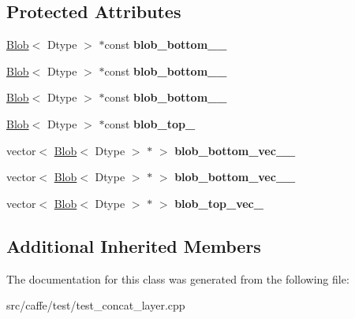 \subsection*{Protected Attributes}
\begin{DoxyCompactItemize}
\item 
\mbox{\label{classcaffe_1_1_concat_layer_test_aa9a684205bc4a4d5c55ef4ef3d6e5527}} 
\mbox{\hyperlink{classcaffe_1_1_blob}{Blob}}$<$ Dtype $>$ $\ast$const {\bfseries blob\+\_\+bottom\+\_\+\_\+}
\item 
\mbox{\label{classcaffe_1_1_concat_layer_test_ad98178e3e167b8954ba9d206c690006c}} 
\mbox{\hyperlink{classcaffe_1_1_blob}{Blob}}$<$ Dtype $>$ $\ast$const {\bfseries blob\+\_\+bottom\+\_\+\_\+}
\item 
\mbox{\label{classcaffe_1_1_concat_layer_test_a7b25b1484e2086b7213f8bdb08805f25}} 
\mbox{\hyperlink{classcaffe_1_1_blob}{Blob}}$<$ Dtype $>$ $\ast$const {\bfseries blob\+\_\+bottom\+\_\+\_\+}
\item 
\mbox{\label{classcaffe_1_1_concat_layer_test_aadb76716632a13c78dec8366b6d49234}} 
\mbox{\hyperlink{classcaffe_1_1_blob}{Blob}}$<$ Dtype $>$ $\ast$const {\bfseries blob\+\_\+top\+\_\+}
\item 
\mbox{\label{classcaffe_1_1_concat_layer_test_ab7563c18e8a8a8715a55e140d75a75a3}} 
vector$<$ \mbox{\hyperlink{classcaffe_1_1_blob}{Blob}}$<$ Dtype $>$ $\ast$ $>$ {\bfseries blob\+\_\+bottom\+\_\+vec\+\_\+\_\+}
\item 
\mbox{\label{classcaffe_1_1_concat_layer_test_a7385ddb383f3dcee984a28bf911b04e1}} 
vector$<$ \mbox{\hyperlink{classcaffe_1_1_blob}{Blob}}$<$ Dtype $>$ $\ast$ $>$ {\bfseries blob\+\_\+bottom\+\_\+vec\+\_\+\_\+}
\item 
\mbox{\label{classcaffe_1_1_concat_layer_test_ab7cbf4e334685c8bef6426e06fb6d2ec}} 
vector$<$ \mbox{\hyperlink{classcaffe_1_1_blob}{Blob}}$<$ Dtype $>$ $\ast$ $>$ {\bfseries blob\+\_\+top\+\_\+vec\+\_\+}
\end{DoxyCompactItemize}
\subsection*{Additional Inherited Members}


The documentation for this class was generated from the following file\+:\begin{DoxyCompactItemize}
\item 
src/caffe/test/test\+\_\+concat\+\_\+layer.\+cpp\end{DoxyCompactItemize}
